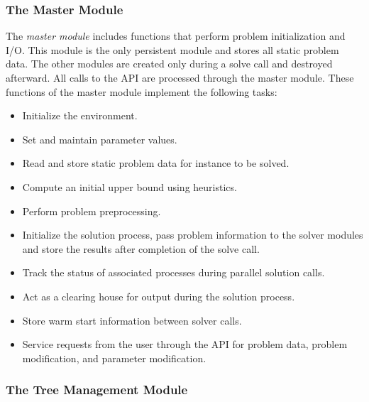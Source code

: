 \subsubsection{The Master Module}
\label{master-process}

The {\em master module} includes functions that perform problem initialization
and I/O. This module is the only persistent module and stores all static
problem data. The other modules are created only during a solve call and
destroyed afterward. All calls to the API are processed through the master
module. These functions of the master module implement the following tasks:
\begin{itemize}
        \item Initialize the environment.
        \item Set and maintain parameter values.
        \item Read and store static problem data for instance to be solved.
        \item Compute an initial upper bound using heuristics.
        \item Perform problem preprocessing.
        \item Initialize the solution process, pass problem information to the
        solver modules and store the results after completion of the solve 
	call.
        \item Track the status of associated processes during parallel
        solution calls.
        \item Act as a clearing house for output during the solution process.
        \item Store warm start information between solver calls.
        \item Service requests from the user through the API for problem data,
        problem modification, and parameter modification.
\end{itemize}

\subsubsection{The Tree Management Module}

